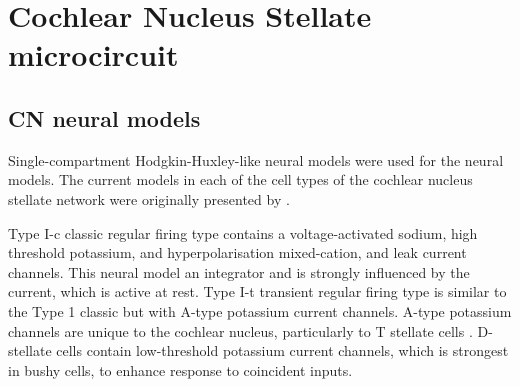 





\section{Cochlear Nucleus Stellate microcircuit \label{sec:CN:cochl-nucl-stell}}

\subsection{CN neural models}

Single-compartment Hodgkin-Huxley-like neural models were used for the neural
models.  The current models in each of the cell types of the cochlear nucleus
stellate network were originally presented by \citet{RothmanManis:2003b}.


Type I-c classic regular firing type contains a voltage-activated sodium, high
threshold potassium, and hyperpolarisation mixed-cation, and leak current
channels.  This neural model an integrator and is strongly influenced by the \Ih
current, which is active at rest.  Type I-t transient regular firing type is
similar to the Type 1 classic but with A-type potassium current channels.
A-type potassium channels are unique to the cochlear nucleus, particularly to T
stellate cells \citep{RothmanManis:2003,RothmanManis:2003a}.  D-stellate cells
contain low-threshold potassium current channels, which is strongest in bushy
cells, to enhance response to coincident inputs.


